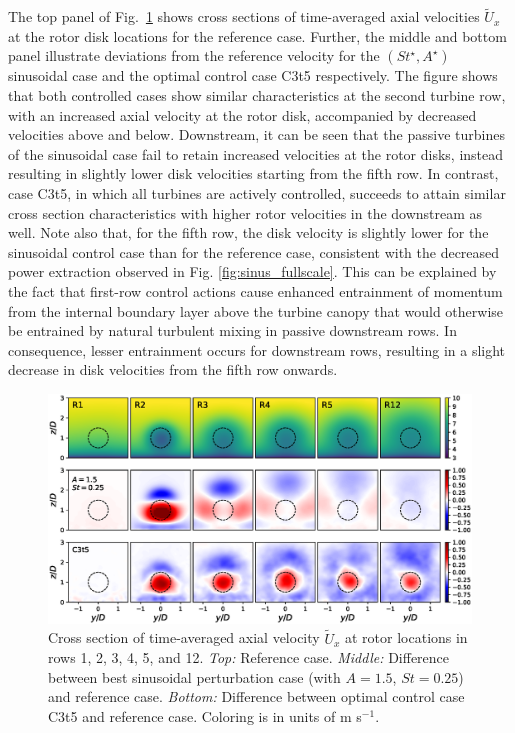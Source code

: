 \documentclass[wes, manuscript]{copernicus}
\newcommand{\revision}[1]{{\color{blue} #1}}
\begin{document}
The top panel of Fig.~\ref{fig:cross_section_sinus} shows cross sections of time-averaged axial velocities $\widetilde{U}_x$ at the rotor disk locations for the reference case. Further, the middle and bottom panel illustrate deviations from the reference velocity for the $(St^\star, A^\star)$ sinusoidal case and the optimal control case C3t5 respectively.  The figure shows that both controlled cases show similar characteristics at the second turbine row, with an increased axial velocity at the rotor disk, accompanied by decreased velocities above and below. Downstream, it can be seen that the passive turbines of the sinusoidal case fail to retain increased velocities at the rotor disks, instead resulting in slightly lower disk velocities starting from the fifth row. In contrast, case C3t5, in which all turbines are actively controlled, succeeds to attain similar cross section characteristics with higher rotor velocities in the downstream as well. \revision{Note also that, for the fifth row, the disk velocity is slightly lower for the sinusoidal control case than for the reference case, consistent with the decreased power extraction observed in Fig. \ref{fig:sinus_fullscale}. This can be explained by the fact that first-row control actions cause enhanced entrainment of momentum from the internal boundary layer above the turbine canopy that would otherwise be entrained by natural turbulent mixing in passive downstream rows. In consequence, lesser entrainment occurs for downstream rows, resulting in a slight decrease in disk velocities from the fifth row onwards.}

\begin{figure}
	\centering
	\includegraphics[width=\textwidth]{figure20}
	\caption{Cross section of time-averaged axial velocity $\widetilde{U}_x$ at rotor locations in rows 1, 2, 3, 4, 5, and 12. \emph{Top: } Reference case. \emph{Middle: } Difference between best sinusoidal perturbation case (with $A = 1.5$, $St = 0.25$) and reference case. \emph{Bottom: } Difference between optimal control case C3t5 and reference case. Coloring is in units of m s$^{-1}$. \label{fig:cross_section_sinus}}
\end{figure}
\end{document}
